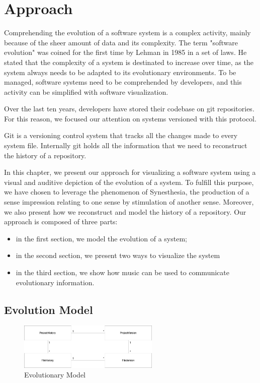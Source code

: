 
\chapter[Approach]{Approach}
\graphicspath{ {images/approach} }

Comprehending the evolution of a software system is a complex activity, mainly because of the sheer amount of data and its complexity. 
The term "software evolution" was coined for the first time by Lehman in 1985 in a set of laws. \cite{Lehman1985}
He stated that the complexity of a system is destinated to increase over time, as the system always needs to be adapted to its evolutionary environments. 
To be managed, software systems need to be comprehended by developers, and this activity can be simplified with software visualization. 

Over the last ten years, developers have stored their codebase on git repositories. 
For this reason, we focused our attention on systems versioned with this protocol.

Git is a versioning control system that tracks all the changes made to every system file. 
Internally git holds all the information that we need to reconstruct the history of a repository. 

In this chapter, we present our approach for visualizing a software system using a visual and auditive depiction of the evolution of a system. 
To fulfill this purpose, we have chosen to leverage the phenomenon of Synesthesia, the production of a sense impression relating to one sense by stimulation of another sense.
Moreover, we also present how we reconstruct and model the history of a repository. 
\bigbreak
Our approach is composed of three parts: 
\begin{itemize}
    \item in the first section, we model the evolution of a system; 
    \item in the second section, we present two ways to visualize the system 
    \item in the third section, we show how music can be used to communicate evolutionary information. 
\end{itemize}


\section{Evolution Model}
\label{s:EvolutionModel}

\begin{figure}[H]
    \begin{center}
        \includegraphics[width=0.6\textwidth]{EvolutionaryModel.jpg}
    \end{center}
    \caption{Evolutionary Model}
    \label{fig:EvolutionaryModel}
\end{figure}

